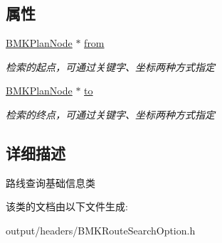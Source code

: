 \subsection*{属性}
\begin{DoxyCompactItemize}
\item 
\hypertarget{interface_b_m_k_base_route_plan_option_afb4bc6a8468e1bf3dbb24c86abf06827}{}\hyperlink{interface_b_m_k_plan_node}{B\+M\+K\+Plan\+Node} $\ast$ \hyperlink{interface_b_m_k_base_route_plan_option_afb4bc6a8468e1bf3dbb24c86abf06827}{from}\label{interface_b_m_k_base_route_plan_option_afb4bc6a8468e1bf3dbb24c86abf06827}

\begin{DoxyCompactList}\small\item\em 检索的起点，可通过关键字、坐标两种方式指定 \end{DoxyCompactList}\item 
\hypertarget{interface_b_m_k_base_route_plan_option_a6a01852ca226bdc1f580bb4a10745c62}{}\hyperlink{interface_b_m_k_plan_node}{B\+M\+K\+Plan\+Node} $\ast$ \hyperlink{interface_b_m_k_base_route_plan_option_a6a01852ca226bdc1f580bb4a10745c62}{to}\label{interface_b_m_k_base_route_plan_option_a6a01852ca226bdc1f580bb4a10745c62}

\begin{DoxyCompactList}\small\item\em 检索的终点，可通过关键字、坐标两种方式指定 \end{DoxyCompactList}\end{DoxyCompactItemize}


\subsection{详细描述}
路线查询基础信息类 

该类的文档由以下文件生成\+:\begin{DoxyCompactItemize}
\item 
output/headers/B\+M\+K\+Route\+Search\+Option.\+h\end{DoxyCompactItemize}
